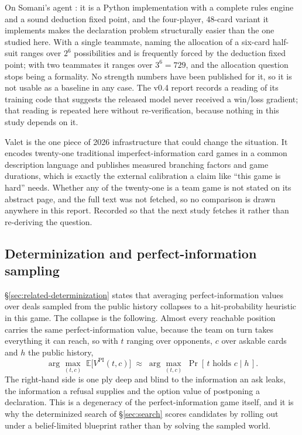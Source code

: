 On Somani's agent \cite{somani,somani-server}: it is a Python implementation
with a complete rules engine and a sound deduction fixed point, and the
four-player, 48-card variant it implements makes the declaration problem
structurally easier than the one studied here. With a single teammate, naming
the allocation of a six-card half-suit ranges over $2^6$ possibilities and is
frequently forced by the deduction fixed point; with two teammates it ranges
over $3^6 = 729$, and the allocation question stops being a formality. No
strength numbers have been published for it, so it is not usable as a baseline
in any case. The v0.4 report records a reading of its training code that
suggests the released model never received a win/loss gradient; that reading is
repeated here without re-verification, because nothing in this study depends on
it.

Valet \cite{goadrich2026valet} is the one piece of 2026 infrastructure that
could change the situation. It encodes twenty-one traditional
imperfect-information card games in a common description language and publishes
measured branching factors and game durations, which is exactly the external
calibration a claim like ``this game is hard'' needs. Whether any of the
twenty-one is a team game is not stated on its abstract page, and the full text
was not fetched, so no comparison is drawn anywhere in this report. Recorded so
that the next study fetches it rather than re-deriving the question.

\subsection{Determinization and perfect-information sampling}
\label{app:rel-determinization}

\S\ref{sec:related-determinization} states that averaging perfect-information
values over deals sampled from the public history collapses to a hit-probability
heuristic in this game. The collapse is the following. Almost every reachable
position carries the same perfect-information value, because the team on turn
takes everything it can reach, so with $t$ ranging over opponents, $c$ over
askable cards and $h$ the public history,
\[
  \arg\max_{(t,c)} \; \mathbb{E}\bigl[V^{\mathrm{PI}}(t,c)\bigr]
  \;\approx\;
  \arg\max_{(t,c)} \; \Pr[\,t \text{ holds } c \mid h\,].
\]
The right-hand side is one ply deep and blind to the information an ask leaks,
the information a refusal supplies and the option value of postponing a
declaration. This is a degeneracy of the perfect-information game itself, and it
is why the determinized search of \S\ref{sec:search} scores candidates by
rolling out under a belief-limited blueprint rather than by solving the sampled
world.

